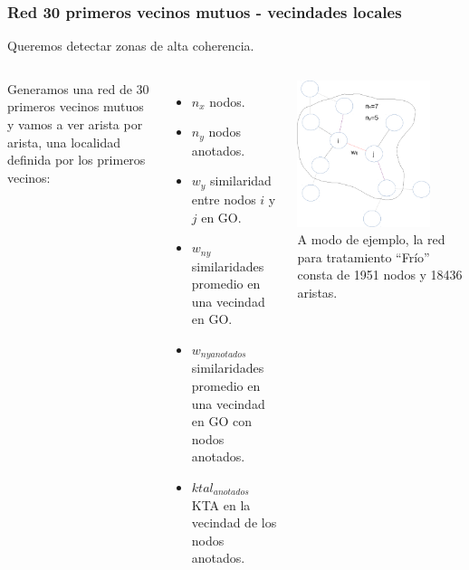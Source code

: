 \documentclass[serif,9pt, t]{beamer}
\newcommand\Fontvi{\fontsize{7}{7.2}\selectfont}
\begin{document}
\begin{frame}\frametitle{Red 30 primeros vecinos mutuos - vecindades locales} 
\centering
Queremos detectar zonas de alta coherencia.\\
\bigskip
\begin{columns}[T]
	 Generamos una red de 30 primeros vecinos mutuos y vamos a ver arista por arista, una localidad definida por los primeros vecinos:\\
	\begin{itemize}
	\item $n_x$ nodos.
	\item $n_y$ nodos anotados.
	\item $w_y$ similaridad entre nodos $i$ y $j$ en GO.
	\item $w_{ny}$ similaridades promedio en una vecindad en GO.
	\item $w_{ny anotados}$ similaridades promedio en una vecindad en GO con nodos anotados.	
	\item $ktal_{anotados}$ KTA en la vecindad de los nodos anotados.		
	\end{itemize}
    \centering
    \bigskip
    \includegraphics[width=0.8\textwidth]{vecindario_local.pdf}\\
    \bigskip
    \Fontvi
	A modo de ejemplo, la red para tratamiento ``Frío'' consta de 1951 nodos y 18436 aristas.
\end{columns}
\end{frame}
\end{document}
